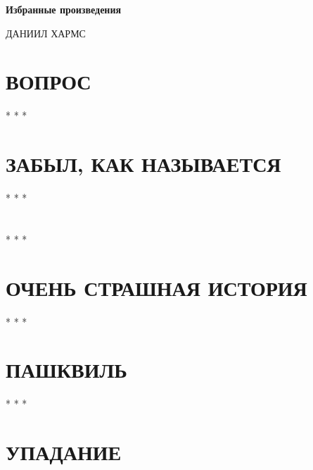 \documentclass[a4paper,12pt,openany]{book}  %
\begin{document}
\pagestyle{plain}

\begin{center}
{\Large\bfseries Избранные произведения}
\end{center}
\vspace{0.5cm}
\begin{center}
{\large ДАНИИЛ ХАРМС}
\end{center}
\vspace{1cm}

\chapter{ВОПРОС}

\vspace{0.3cm}

\begin{center}
* * *
\end{center}

\chapter{ЗАБЫЛ, КАК НАЗЫВАЕТСЯ}

\vspace{0.3cm}

\begin{center}
* * *
\end{center}

\chapter{ }

\vspace{0.3cm}

\begin{center}
* * *
\end{center}

\chapter{ОЧЕНЬ СТРАШНАЯ ИСТОРИЯ}

\vspace{0.3cm}

\begin{center}
* * *
\end{center}

\chapter{ПАШКВИЛЬ}

\vspace{0.3cm}

\begin{center}
* * *
\end{center}

\chapter{УПАДАНИЕ}

\end{document}
